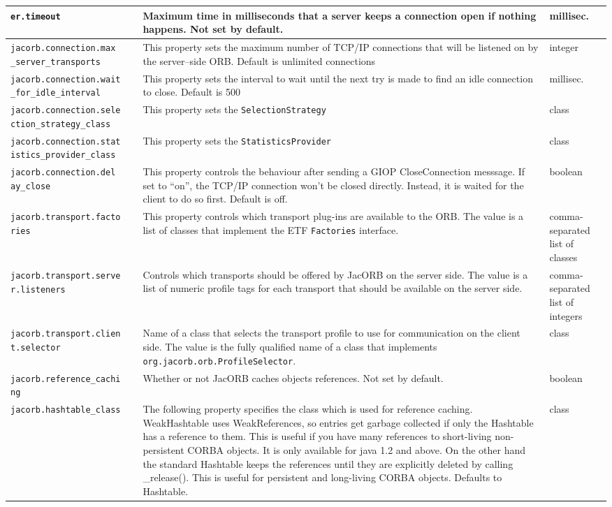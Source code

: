 \begin{small}
\begin{longtable}{|p{5cm}|p{9cm}|p{2cm}|}
\verb"er.timeout" & Maximum time in milliseconds that a server keeps a connection open if nothing happens. Not set by default. & millisec. \\
\hline
\verb"jacorb.connection.max"
\verb"_server_transports" & This property sets the
  maximum number of TCP/IP connections that will be listened on by the
  server--side ORB. Default is unlimited connections & integer \\
\hline
\verb"jacorb.connection.wait"
\verb"_for_idle_interval" & This property sets the
  interval to wait until the next try is made to find an idle connection to
  close. Default is 500 & millisec.\\
\hline
\verb"jacorb.connection.sele"
\verb"ction_strategy_class" & This property sets
  the {\tt Selection\-Strategy} & class \\
\hline
\verb"jacorb.connection.stat"
\verb"istics_provider_class" & This property sets
  the {\tt Statistics\-Provider} & class \\
\hline
\verb"jacorb.connection.del"
\verb"ay_close" & This property controls the behaviour after sending a GIOP
CloseConnection messsage. If set to ``on'', the TCP/IP connection won't be
closed directly. Instead, it is waited for the client to do so first. Default is off. & boolean \\
\hline
\verb"jacorb.transport.facto"
\verb"ries" & This property controls which transport plug-ins are
available to the ORB.  The value is a list of classes that implement the ETF
{\tt Factories} interface.
& comma-separated list of classes\\
\hline
\verb"jacorb.transport.serve"
\verb"r.listeners" & Controls which transports should be offered by
JacORB on the server side.  The value is a list of numeric profile
tags for each transport that should be available on the server side.
& comma-separated list of integers\\
\hline
\verb"jacorb.transport.clien"
\verb"t.selector" & Name of a class that selects the transport profile
to use for communication on the client side.  The value is the fully
qualified name of a class that implements {\tt
  org.jacorb.orb.ProfileSelector}.
& class\\
\hline
\verb"jacorb.reference_cachi"
\verb"ng" & Whether or not JacORB caches objects references. Not set by default. & boolean \\
\hline
\verb"jacorb.hashtable_class" & The following property specifies the class which is used for reference caching. WeakHashtable uses WeakReferences, so entries get garbage collected if only the Hashtable has a reference to them. This is useful if you have many references to short-living non-persistent CORBA objects. It is only available for java 1.2 and above. On the other hand the standard Hashtable keeps the references until they are explicitly deleted by calling \_release(). This is useful for persistent and long-living CORBA objects. Defaults to Hashtable. & class \\

\end{longtable}
\end{small}
